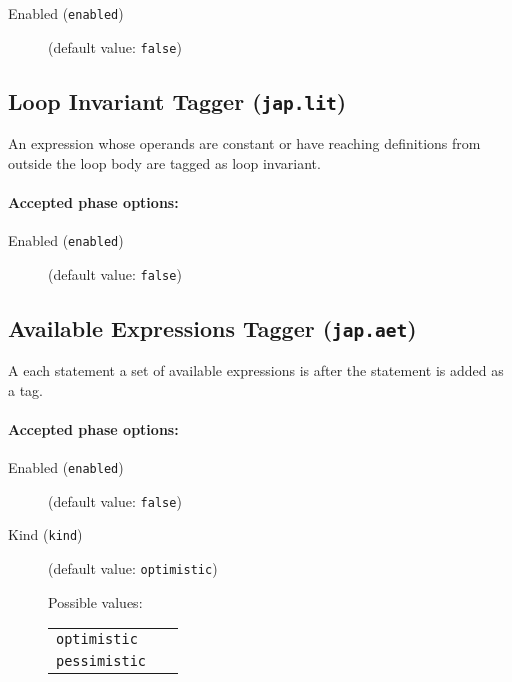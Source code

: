 \documentclass{article}
\begin{document}
\begin{description}

\item[Enabled ({\tt enabled})]
(default value: {\tt false})






\end{description}

\subsection{Loop Invariant Tagger ({\tt jap.lit})}
An expression whose operands are constant or have reaching definitions from outside the loop body are tagged as loop invariant.

\paragraph{Accepted phase options:} 

\begin{description}

\item[Enabled ({\tt enabled})]
(default value: {\tt false})






\end{description}

\subsection{Available Expressions Tagger ({\tt jap.aet})}
A each statement a set of available expressions is after the statement is added as a tag.

\paragraph{Accepted phase options:} 

\begin{description}

\item[Enabled ({\tt enabled})]
(default value: {\tt false})






\item[Kind ({\tt kind})]
(default value: {\tt optimistic})







Possible values:\\
\begin{longtable}{p{1in}p{4in}}

{\tt optimistic }
&
\\

{\tt pessimistic }
&
\\

\end{longtable}


\end{description}
\end{document}
